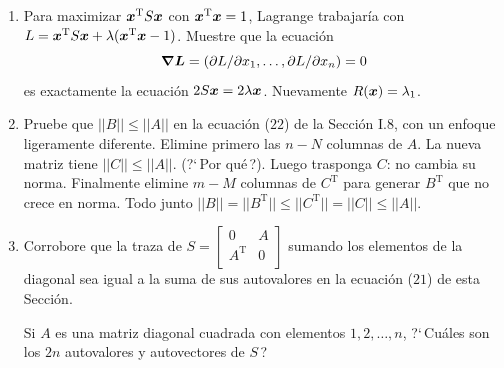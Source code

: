\documentclass[12pt,a4paper]{article}
\newcommand{\bi}[1]{\hbox{\boldmath$#1$}}
\newcommand\1{\mbox{\,\vrule height-0.8pt depth1.0pt width2pc\,}}
\newcommand\2{\mbox{\,\vrule height-0.8pt depth1.0pt width1pc\,}}
\DeclareRobustCommand\transp{^{\mathrm{T}}}
\begin{document}
\begin{enumerate}

\item Para maximizar $\bi{x}\transp S\bi{x}$ con  $\bi{x}\transp\bi{x}=1$, Lagrange trabajar\'ia con $L=\bi{x}\transp S\bi{x}+\lambda(\bi{x}\transp\bi{x}-1)$. Muestre que la ecuación 
\[\bi{\nabla L}=(\partial L/\partial x_1,\ldots,\partial L/\partial x_n)=0 \]
es exactamente la ecuación $2S\bi{x}=2\lambda\bi{x}$. Nuevamente $R(\bi{x})=\lambda_1$.





\item Pruebe que $||B||\leq||A||$ en la ecuaci\'on ($22$) de la Sección I.8, con un enfoque ligeramente diferente. Elimine primero las $n-N$ columnas de $A$. La nueva matriz tiene  $||C||\leq||A||$. (?`\,Por qu\'e\,?). Luego trasponga $C$: no cambia su norma. Finalmente elimine   $m-M$ columnas de $C\transp$ para generar $B\transp$ que no crece en norma. Todo junto
 $||B||=||B\transp||\leq|| C\transp||=||C||\leq||A||$.




\item Corrobore que la traza de $S=\left[\begin{array}{cc}0&A\\A\transp&0\\\end{array}\right]$ sumando los elementos de la diagonal sea igual a la suma de sus autovalores en la ecuaci\'on   ($21$) de esta Sección. 

Si $A$ es una matriz diagonal cuadrada con elementos $1,2,\ldots,n$, ?`\,Cu\'ales son los  $2n$ autovalores y autovectores de $S$\,?




\end{enumerate}
\end{document}
